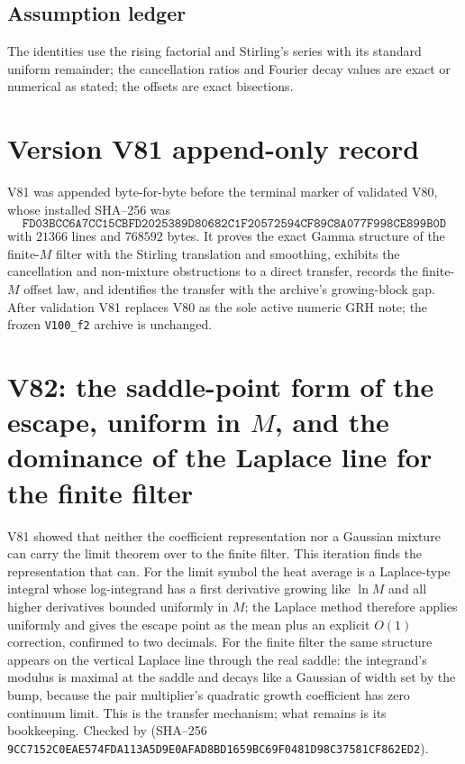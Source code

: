 \documentclass[11pt]{article}
\theoremstyle{definition}
\theoremstyle{remark}
\begin{document}
\subsection*{Assumption ledger}
\label{ass:f2v81}
The identities use the rising factorial and Stirling's series with its
standard uniform remainder; the cancellation ratios and Fourier decay
values are exact or numerical as stated; the offsets are exact
bisections.
\endgroup

\section*{Version V81 append-only record}

V81 was appended byte-for-byte before the terminal marker of validated
V80, whose installed SHA--256 was
\[
 \texttt{FD03BCC6A7CC15CBFD2025389D80682C}
 \allowbreak\texttt{1F20572594CF89C8A077F998CE899B0D}
\]
with \(21366\) lines and \(768592\) bytes.  It proves the exact Gamma
structure of the finite-\(M\) filter with the Stirling translation and
smoothing, exhibits the cancellation and non-mixture obstructions to a
direct transfer, records the finite-\(M\) offset law, and identifies the
transfer with the archive's growing-block gap.  After validation V81
replaces V80 as the sole active numeric GRH note; the frozen
\texttt{V100\_f2} archive is unchanged.





\clearpage
\section{V82: the saddle-point form of the escape, uniform in \texorpdfstring{$M$}{M}, and the dominance of the Laplace line for the finite filter}
\label{sec:f2v82-saddle}
\begingroup
\setcounter{equation}{0}
\renewcommand{\theequation}{N82.\arabic{equation}}
\renewcommand{\theHequation}{f2v82.\arabic{equation}}

V81 showed that neither the coefficient representation nor a Gaussian
mixture can carry the limit theorem over to the finite filter.  This
iteration finds the representation that can.  For the limit symbol the
heat average is a Laplace-type integral whose log-integrand has a first
derivative growing like \(\ln M\) and all higher derivatives bounded
uniformly in \(M\); the Laplace method therefore applies uniformly and
gives the escape point as the mean plus an explicit \(O(1)\) correction,
confirmed to two decimals.  For the finite filter the same structure
appears on the vertical Laplace line through the real saddle: the
integrand's modulus is maximal at the saddle and decays like a Gaussian
of width set by the bump, because the pair multiplier's quadratic growth
coefficient has zero continuum limit.  This is the transfer mechanism;
what remains is its bookkeeping.  Checked by
 (SHA--256
\texttt{9CC7152C0EAE574FDA113A5D9E0AFAD8}\allowbreak\texttt{BD1659BC69F0481D98C37581CF862ED2}).
\end{document}
